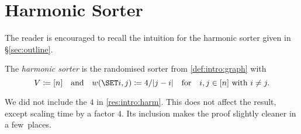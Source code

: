 \documentclass{article}
\begin{document}
\section{Harmonic Sorter}
\label{sec:harm}

The reader is encouraged to recall the intuition for the harmonic sorter given in \S\ref{sec:outline}.

%
%
%
%

\begin{defn}%
The \textit{harmonic sorter} is the randomised sorter from \cref{def:intro:graph} with
\[
	V
\cq
	[n]
\Qand
	w(\set{i,j})
\cq
	4/\abs{j - i}
\Qfor
	i,j \in [n]
\text{ with }
	i \ne j.
\]
\end{defn}

\begin{rmkt}
We did not include the $4$ in \cref{res:intro:harm}.
This does not affect the result, except scaling time by a factor $4$.
Its inclusion makes the proof slightly cleaner in a few~places.
\end{rmkt}
\end{document}
